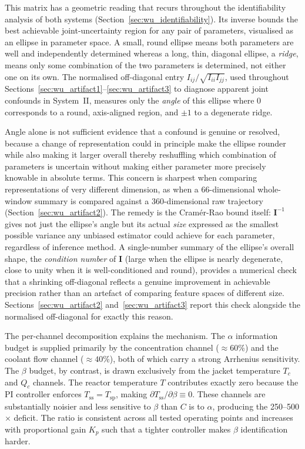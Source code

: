 \documentclass[aps,pre,twocolumn,superscriptaddress]{revtex4-2}
\begin{document}
This matrix has a geometric reading that recurs throughout the identifiability
analysis of both systems (Section~\ref{sec:wu_identifiability}). Its inverse
bounds the best achievable joint-uncertainty region for any pair of
parameters, visualised as an ellipse in parameter space.  A small, round
ellipse means both parameters are well and independently determined whereas a long,
thin, diagonal ellipse, a \emph{ridge}, means only some combination of
the two parameters is determined, not either one on its own.  The normalised
off-diagonal entry $I_{ij}/\sqrt{I_{ii}I_{jj}}$, used throughout
Sections~\ref{sec:wu_artifact1}--\ref{sec:wu_artifact3} to diagnose apparent
joint confounds in System~II, measures only the \emph{angle} of this
ellipse where 0 corresponds to a round, axis-aligned region, and $\pm1$ to a
degenerate ridge.

Angle alone is not sufficient evidence that a confound is genuine or
resolved, because a change of representation could in principle make the
ellipse rounder while also making it larger overall thereby reshuffling which
combination of parameters is uncertain without making either parameter more
precisely knowable in absolute terms.  This concern is sharpest when
comparing representations of very different dimension, as when a
66-dimensional whole-window summary is compared against a 360-dimensional
raw trajectory (Section~\ref{sec:wu_artifact2}). The remedy is the
Cram\'er-Rao bound itself: $\mathbf{I}^{-1}$ gives not just the ellipse's
angle but its actual \emph{size} expressed as the smallest possible variance any
unbiased estimator could achieve for each parameter, regardless of
inference method. A single-number summary of the ellipse's overall shape,
the \emph{condition number} of $\mathbf{I}$ (large when the ellipse is
nearly degenerate, close to unity when it is well-conditioned and round),
provides a numerical check that a shrinking off-diagonal reflects a
genuine improvement in achievable precision rather than an artefact of
comparing feature spaces of different size. Sections~\ref{sec:wu_artifact2}
and~\ref{sec:wu_artifact3} report this check alongside the normalised
off-diagonal for exactly this reason.

The per-channel decomposition explains the mechanism.  The $\alpha$
information budget is supplied primarily by the concentration channel
($\approx 60$\%) and the coolant flow channel ($\approx 40$\%), both of which
carry a strong Arrhenius sensitivity.  The $\beta$ budget, by contrast, is
drawn exclusively from the jacket temperature $T_c$ and $Q_c$ channels. The
reactor temperature $T$ contributes exactly zero because the PI controller
enforces $T_\mathrm{ss} = T_\mathrm{sp}$, making $\partial T_\mathrm{ss}/\partial\beta \equiv 0$.
These channels are substantially noisier and less sensitive to $\beta$ than
$C$ is to $\alpha$, producing the 250--500$\times$ deficit. The ratio is
consistent across all tested operating points and increases with proportional gain $K_p$ such that a tighter controller makes $\beta$ identification harder.
\end{document}
